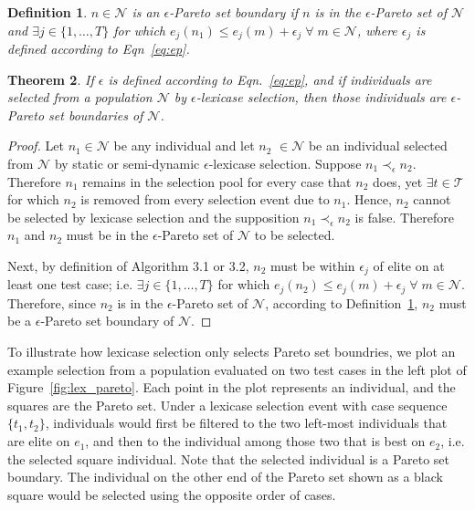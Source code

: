\documentclass[twoside]{article}
\newtheorem{lex}{Theorem}[section]
\newtheorem{defn}[lex]{Definition}
\begin{document}
\begin{defn}\label{def:eboundary}
$n \in \mathcal{N}$ is an {\it $\epsilon$-Pareto set boundary} if $n$ is in the $\epsilon$-Pareto set of $\mathcal{N}$ and $\exists j \in \{1,\dots,T\}$ for which $e_j(n_1) \leq e_j(m) + \epsilon_j \; \forall \; m \in \mathcal{N}$, where $\epsilon_j$ is defined according to Eqn~\ref{eq:ep}. \bigskip
\end{defn}

\begin{lex}\label{thm:eplex}
If $\epsilon$ is defined according to Eqn.~\ref{eq:ep}, and if individuals are selected from a population $\mathcal{N}$ by $\epsilon$-lexicase selection, then those individuals are $\epsilon$-Pareto set boundaries of $\mathcal{N}$.  
\end{lex}


\begin{proof}
Let $n_1 \in \mathcal{N}$ be any individual and let $n_2$ $\in \mathcal{N}$ be an individual selected from $\mathcal{N}$ by static or semi-dynamic $\epsilon$-lexicase selection. Suppose $n_1 \prec_{\epsilon} n_2$. Therefore $n_1$ remains in the selection pool for every case that $n_2$ does, yet $\exists t \in \mathcal{T}$ for which $n_2$ is removed from every selection event due to $n_1$. Hence, $n_2$ cannot be selected by lexicase selection and the supposition $n_1 \prec_{\epsilon} n_2$ is false.  Therefore $n_1$ and $n_2$ must be in the $\epsilon$-Pareto set of $\mathcal{N}$ to be selected. 

Next, by definition of Algorithm 3.1 or 3.2, $n_2$ must be within $\epsilon_j$ of elite on at least one test case; i.e. $\exists j \in \{1,\dots,T\}$ for which $e_j(n_2) \leq e_j(m) + \epsilon_j \; \forall \; m \in \mathcal{N}$. Therefore, since $n_2$ is in the $\epsilon$-Pareto set of $\mathcal{N}$, according to Definition~\ref{def:eboundary}, $n_2$ must be a $\epsilon$-Pareto set boundary of $\mathcal{N}$.  
\end{proof}
\bigskip

To illustrate how lexicase selection only selects Pareto set boundries, we plot an example selection from a population evaluated on two test cases in the left plot of Figure~\ref{fig:lex_pareto}. Each point in the plot represents an individual, and the squares are the Pareto set. Under a lexicase selection event with case sequence $\{t_1, t_2\}$, individuals would first be filtered to the two left-most individuals that are elite on $e_1$, and then to the individual among those two that is best on $e_2$, i.e. the selected square individual. Note that the selected individual is a Pareto set boundary. The individual on the other end of the Pareto set shown as a black square would be selected using the opposite order of cases.  
\end{document}
